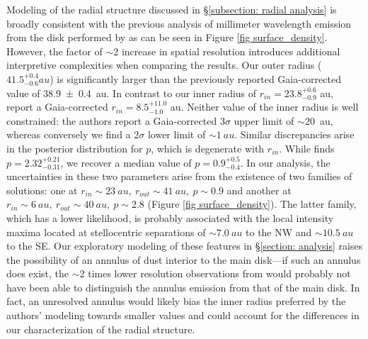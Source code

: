 \documentclass[modern]{aastex62}
\begin{document}
Modeling of the radial structure discussed in \S \ref{subsection: radial analysis} is broadly consistent with the previous analysis of millimeter wavelength emission from the disk performed by \citet{macgregor13} as can be seen in Figure \ref{fig surface_density}. 
However, the factor of $\sim 2$ increase in spatial resolution introduces additional interpretive complexities when comparing the results.
Our outer radius ($41.5^{+0.4}_{-0.6} \si{au}$) is significantly larger than the previously reported Gaia-corrected value of \SI{38.9 \pm 0.4}{au}.
In contrast to our inner radius of $r_{in} = 23.8_{-0.9}^{ +0.6}$ \si{au}, \citet{macgregor13} report a Gaia-corrected $r_{in} = 8.5_{-1.0} ^{+11.0}$ \si{au}.
Neither value of the inner radius is well constrained: the authors report a Gaia-corrected $3 \sigma$ upper limit of $\sim$\SI{20}{au}, whereas conversely we find a $2 \sigma$ lower limit of $\sim \SI{1}{au}$.
Similar discrepancies arise in the posterior distribution for $p$, which is degenerate with $r_{in}$.
While \citet{macgregor13} finds $p=2.32_{-0.31}^{+0.21}$, we recover a median value of $p=0.9_{-0.4}^{+0.5}$.
In our analysis, the uncertainties in these two parameters arise from the existence of two families of solutions: one at $r_{in} \sim \SI{23}{au},\ r_{out} \sim \SI{41}{au},\ p \sim 0.9$ and another at $r_{in} \sim \SI{6}{au},\ r_{out} \sim \SI{40}{au},\ p \sim 2.8$ (Figure \ref{fig surface_density}).
The latter family, which has a lower likelihood, is probably associated with the local intensity maxima located at stellocentric separations of $\sim \SI{7.0}{au}$ to the NW and $\sim \SI{10.5}{au}$ to the SE.
Our exploratory modeling of these features in \S \ref{section: analysis} raises the possibility of an annulus of dust interior to the main disk---if such an annulus does exist, the $\sim 2$ times lower resolution observations from \citet{macgregor13} would probably not have been able to distinguish the annulus emission from that of the main disk.
In fact, an unresolved annulus would likely bias the inner radius preferred by the authors' modeling towards smaller values and could account for the differences in our characterization of the radial structure.
\end{document}
